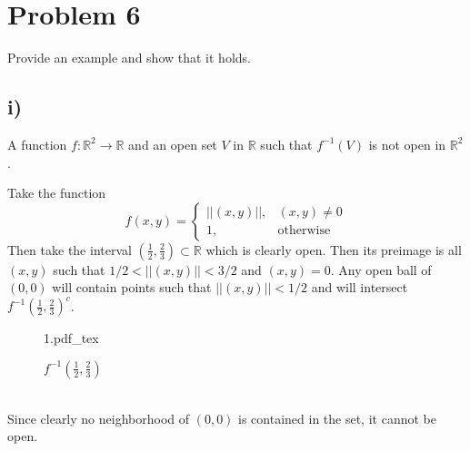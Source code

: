 \documentclass{article}
\newcommand{\incfig}[1]{%
    \def\svgwidth{.25\linewidth}
    {#1.pdf_tex}
}
\theoremstyle{definition}
\begin{document}
\section*{Problem 6}
    Provide an example and show that it holds.
    \subsection*{i)}
    \begin{mdframed}
        A function $f:\mathbb{R}^2 \rightarrow \mathbb{R}$ and an open set $V$ in $\mathbb{R}$ such that $f^{-1}(V)$ is not open in
        $\mathbb{R}^2$.
    \end{mdframed}
    Take the function $$f(x,y) = \begin{cases}
        ||(x,y)||, & (x,y)\neq 0\\
        1, & \text{otherwise}
    \end{cases}$$ Then take the interval $(\frac{1}{2},\frac{2}{3}) \subset \mathbb{R}$ which is clearly open.
    Then its preimage is all $(x,y)$ such that $1/2 < ||(x,y)|| < 3/2$ and $(x,y) = 0$.
    Any open ball of $(0,0)$ will contain points such that $||(x,y)|| < 1/2$ and will intersect $f^{-1}(\frac{1}{2}, \frac{2}{3})^c$.
    \begin{figure}[ht]
        \centering
        \incfig{1}
        \caption{$f^{-1}(\frac{1}{2},\frac{2}{3})$}
        \label{fig:1}
    \end{figure}
    \\
    Since clearly no neighborhood of $(0,0)$ is contained in the set, it cannot be open.
\end{document}
